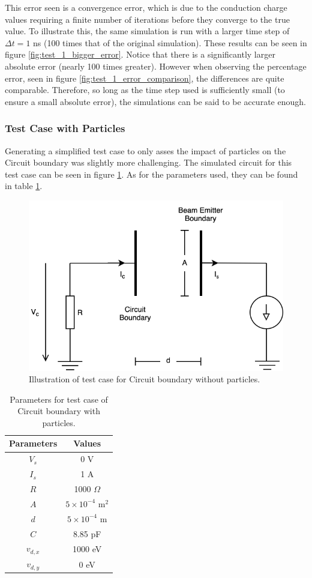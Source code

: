 This error seen is a convergence error, which is due to the conduction charge values requiring a finite number of iterations before they converge to the true value. To illustrate this, the same simulation is run with a larger time step of  $\Delta t = 1$ ns (100 times that of the original simulation). These results can be seen in figure \ref{fig:test_1_bigger_error}. Notice that there is a significantly larger absolute error (nearly 100 times greater). However when observing the percentage error, seen in figure \ref{fig:test_1_error_comparison}, the differences are quite comparable. Therefore, so long as the time step used is sufficiently small (to ensure a small absolute error), the simulations can be said to be accurate enough.

\subsubsection{Test Case with Particles}

Generating a simplified test case to only asses the impact of particles on the Circuit boundary was slightly more challenging. The simulated circuit for this test case can be seen in figure \ref{fig:circuit_test_2}. As for the parameters used, they can be found in table \ref{tb:test_2}. 

\begin{figure}[h!]
	\centering
	\includegraphics[width=0.65\linewidth]{xoopic/figures/circuit_test_2.png}
	\caption{Illustration of test case for Circuit boundary without particles.}
	\label{fig:circuit_test_2}
\end{figure} 

\begin{table}[h!]
	\caption{Parameters for test case of Circuit boundary with particles.}
	\vspace{5 pt}
	\centering
	\begin{tabular}{c c}
		Parameters  & Values 	    			\\
		\hline 
		$V_s$       & 0 V      			        \\
		$I_s$		& 1 A						\\
		$R$         & 1000 $\Omega$ 			\\
		$A$         & $5 \times 10^{-4}$ m$^2$  \\
		$d$         & $5 \times 10^{-4}$ m      \\
		$C$			& 8.85 pF					\\
		$v_{d, x}$	& 1000 eV					\\
		$v_{d, y}$	& 0 eV
	\end{tabular}
	\label{tb:test_2}
\end{table}


